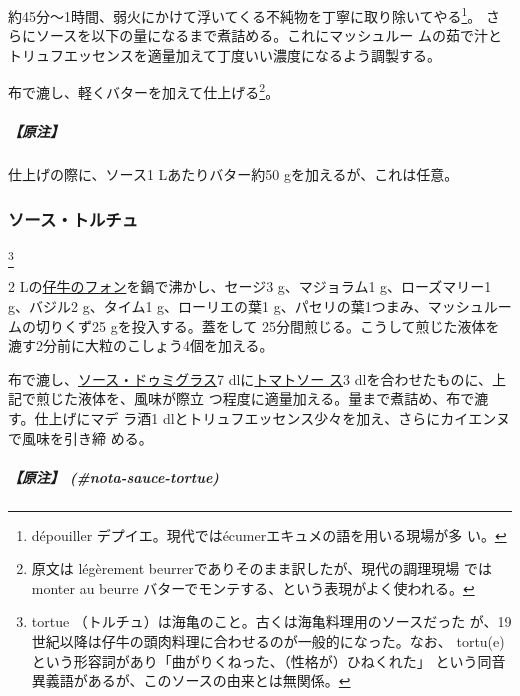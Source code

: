 \begin{recette}
約45分〜1時間、弱火にかけて浮いてくる不純物を丁寧に取り除いてやる\footnote{dépouiller
  デプイエ。現代ではécumerエキュメの語を用いる現場が多 い。}。
さらにソースを\deuxtiers{}以下の量になるまで煮詰める。これにマッシュルー
ムの茹で汁とトリュフエッセンスを適量加えて丁度いい濃度になるよう調製する。

布で漉し、軽くバターを加えて仕上げる\footnote{原文は légèrement
  beurrerでありそのまま訳したが、現代の調理現場 ではmonter au beurre
  バターでモンテする、という表現がよく使われる。}。

\hypertarget{ux539fux6ce8-2}{%
\subparagraph{【原注】}\label{ux539fux6ce8-2}}

仕上げの際に、ソース1 Lあたりバター約50 gを加えるが、これは任意。

\hypertarget{sauce-tortue}{%
\subsubsection{ソース・トルチュ}\label{sauce-tortue}}

\footnote{tortue
  （トルチュ）は海亀のこと。古くは海亀料理用のソースだった
  が、19世紀以降は仔牛の頭肉料理に合わせるのが一般的になった。なお、
  tortu(e)という形容詞があり「曲がりくねった、（性格が）ひねくれた」
  という同音異義語があるが、このソースの由来とは無関係。}


2\undemi{}
Lの\protect\hyperlink{jus-de-veau-brun}{仔牛のフォン}を鍋で沸かし、セージ3
g、マジョラム1 g、ローズマリー1 g、バジル2 g、タイム1 g、ローリエの葉1
g、パセリの葉1つまみ、マッシュルームの切りくず25 gを投入する。蓋をして
25分間煎じる。こうして煎じた液体を漉す2分前に大粒のこしょう4個を加える。

布で漉し、\protect\hyperlink{sauce-demi-glace}{ソース・ドゥミグラス}7
dlに\protect\hyperlink{sauce-tomate}{トマトソー ス}3
dlを合わせたものに、上記で煎じた液体を、風味が際立
つ程度に適量加える。\troisquarts{}量まで煮詰め、布で漉す。仕上げにマデ
ラ酒1 dlとトリュフエッセンス少々を加え、さらにカイエンヌで風味を引き締
める。

\hypertarget{ux539fux6ce8-nota-sauce-tortue}{%
\subparagraph{【原注】
(\#nota-sauce-tortue)}\label{ux539fux6ce8-nota-sauce-tortue}}


\end{recette}
